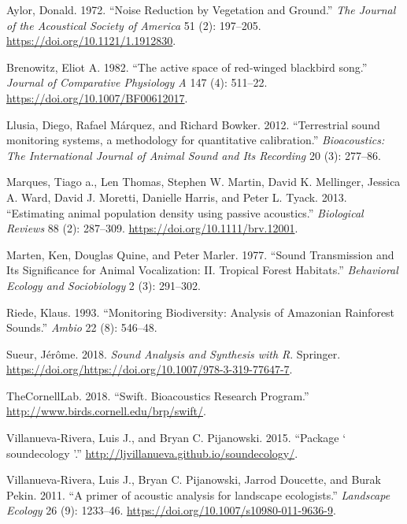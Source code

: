 \documentclass[fleqn,10pt,lineno]{wlpeerj} %
\begin{document}
\leavevmode\hypertarget{ref-Aylor1972}{}%
Aylor, Donald. 1972. ``Noise Reduction by Vegetation and Ground.'' \emph{The Journal of the Acoustical Society of America} 51 (2): 197--205. \url{https://doi.org/10.1121/1.1912830}.

\leavevmode\hypertarget{ref-Brenowitz1982}{}%
Brenowitz, Eliot A. 1982. ``The active space of red-winged blackbird song.'' \emph{Journal of Comparative Physiology A} 147 (4): 511--22. \url{https://doi.org/10.1007/BF00612017}.

\leavevmode\hypertarget{ref-Llusia2012}{}%
Llusia, Diego, Rafael Márquez, and Richard Bowker. 2012. ``Terrestrial sound monitoring systems, a methodology for quantitative calibration.'' \emph{Bioacoustics: The International Journal of Animal Sound and Its Recording} 20 (3): 277--86.

\leavevmode\hypertarget{ref-Marques2013}{}%
Marques, Tiago a., Len Thomas, Stephen W. Martin, David K. Mellinger, Jessica A. Ward, David J. Moretti, Danielle Harris, and Peter L. Tyack. 2013. ``Estimating animal population density using passive acoustics.'' \emph{Biological Reviews} 88 (2): 287--309. \url{https://doi.org/10.1111/brv.12001}.

\leavevmode\hypertarget{ref-Marten1977}{}%
Marten, Ken, Douglas Quine, and Peter Marler. 1977. ``Sound Transmission and Its Significance for Animal Vocalization: II. Tropical Forest Habitats.'' \emph{Behavioral Ecology and Sociobiology} 2 (3): 291--302.

\leavevmode\hypertarget{ref-Riede1993}{}%
Riede, Klaus. 1993. ``Monitoring Biodiversity: Analysis of Amazonian Rainforest Sounds.'' \emph{Ambio} 22 (8): 546--48.

\leavevmode\hypertarget{ref-Sueur2018}{}%
Sueur, Jérôme. 2018. \emph{Sound Analysis and Synthesis with R}. Springer. \url{https://doi.org/https://doi.org/10.1007/978-3-319-77647-7}.

\leavevmode\hypertarget{ref-TheCornellLab2018}{}%
TheCornellLab. 2018. ``Swift. Bioacoustics Research Program.'' \url{http://www.birds.cornell.edu/brp/swift/}.

\leavevmode\hypertarget{ref-Villanueva2015}{}%
Villanueva-Rivera, Luis J., and Bryan C. Pijanowski. 2015. ``Package ` soundecology '.'' \url{http://ljvillanueva.github.io/soundecology/}.

\leavevmode\hypertarget{ref-Villanuevaetal2011}{}%
Villanueva-Rivera, Luis J., Bryan C. Pijanowski, Jarrod Doucette, and Burak Pekin. 2011. ``A primer of acoustic analysis for landscape ecologists.'' \emph{Landscape Ecology} 26 (9): 1233--46. \url{https://doi.org/10.1007/s10980-011-9636-9}.
\end{document}
